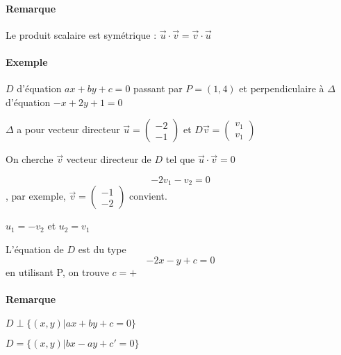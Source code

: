 			\paragraph{Remarque} Le produit scalaire est symétrique : $\vec{u}\cdot\vec{v} = \vec{v}\cdot\vec{u}$

			\paragraph{Exemple} $D$ d'équation $ax + by +c=0$ passant par $P=(1, 4)$ et perpendiculaire  à $\Delta$ d'équation $-x+2y+1=0$

			$\Delta$ a pour vecteur directeur $\vec{u} = \begin{pmatrix}
				-2 \\
			-1\end{pmatrix}$ et $D \vec{v}=\begin{pmatrix}
				v_1 \\
				v_1
			\end{pmatrix}$

			On cherche $\vec{v}$ vecteur directeur de $D$ tel que $\vec{u}\cdot \vec{v} = 0$

			\[-2v_1 - v_2 = 0\], par exemple, $\vec{v} = \begin{pmatrix}
				-1\\
			-2\end{pmatrix}$ convient.

			$u_1 = -v_2$ et $u_2 = v_1$

			L'équation de $D$ est du type \[-2x -y +c = 0\] en utilisant P, on trouve $c=+$

			\paragraph{Remarque} $D \perp \{(x, y) | ax + by + c = 0\}$

			$D=\{(x, y) | bx - ay + c' = 0\}$
